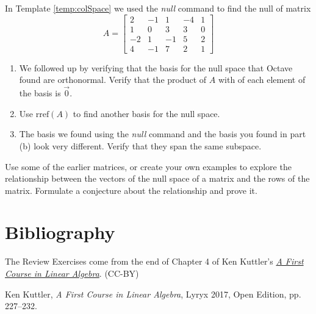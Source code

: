 \documentclass{ximera}
\begin{document}
\begin{problem}\label{prob_oct_Rn1}
    In Template \ref{temp:colSpace} we used the \emph{null} command to find the null of matrix $$A=\begin{bmatrix}2&-1&1&-4&1\\1&0&3&3&0\\-2&1&-1&5&2\\4&-1&7&2&1\end{bmatrix}$$ 

    \begin{enumerate}
        \item We followed up by verifying that the basis for the null space that Octave found are orthonormal.  Verify that the product of $A$ with of each element of the basis is $\vec{0}$.
        \item Use $\text{rref}(A)$ to find another basis for the null space.  
        \item The basis we found using the \emph{null} command and the basis you found in part (b) look very different.  Verify that they span the same subspace.
    \end{enumerate}
\end{problem}

\begin{problem}\label{prob_oct_Rn2}
    Use some of the earlier matrices, or create your own examples to explore the relationship between the vectors of the null space of a matrix and the rows of the matrix.  Formulate a conjecture about the relationship and prove it.
\end{problem}

\section*{Bibliography}
The Review Exercises come from the end of Chapter 4 of Ken Kuttler's \href{https://open.umn.edu/opentextbooks/textbooks/a-first-course-in-linear-algebra-2017}{\it A First Course in Linear Algebra}. (CC-BY)

Ken Kuttler, {\it  A First Course in Linear Algebra}, Lyryx 2017, Open Edition, pp. 227--232.  
\end{document}
